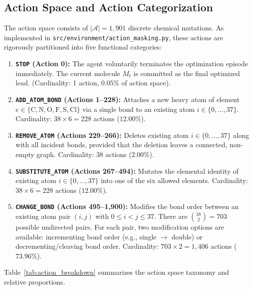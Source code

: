 \documentclass{ieeeaccess}
\begin{document}
\subsection{Action Space and Action Categorization}
The action space consists of $|\mathcal{A}| = 1,901$ discrete chemical mutations. As implemented in \texttt{src/environment/action\_masking.py}, these actions are rigorously partitioned into five functional categories:
\begin{enumerate}
    \item \textbf{\texttt{STOP} (Action 0):} The agent voluntarily terminates the optimization episode immediately. The current molecule $M_t$ is committed as the final optimized lead. (Cardinality: 1 action, $0.05\%$ of action space).
    \item \textbf{\texttt{ADD\_ATOM\_BOND} (Actions 1--228):} Attaches a new heavy atom of element $e \in \{\text{C}, \text{N}, \text{O}, \text{F}, \text{S}, \text{Cl}\}$ via a single bond to an existing atom $i \in \{0, \dots, 37\}$. Cardinality: $38 \times 6 = 228$ actions ($12.00\%$).
    \item \textbf{\texttt{REMOVE\_ATOM} (Actions 229--266):} Deletes existing atom $i \in \{0, \dots, 37\}$ along with all incident bonds, provided that the deletion leaves a connected, non-empty graph. Cardinality: $38$ actions ($2.00\%$).
    \item \textbf{\texttt{SUBSTITUTE\_ATOM} (Actions 267--494):} Mutates the elemental identity of existing atom $i \in \{0, \dots, 37\}$ into one of the six allowed elements. Cardinality: $38 \times 6 = 228$ actions ($12.00\%$).
    \item \textbf{\texttt{CHANGE\_BOND} (Actions 495--1,900):} Modifies the bond order between an existing atom pair $(i, j)$ with $0 \le i < j \le 37$. There are $\binom{38}{2} = 703$ possible undirected pairs. For each pair, two modification options are available: incrementing bond order (e.g., single $\to$ double) or decrementing/cleaving bond order. Cardinality: $703 \times 2 = 1,406$ actions ($73.96\%$).
\end{enumerate}

Table~\ref{tab:action_breakdown} summarizes the action space taxonomy and relative proportions.
\end{document}
